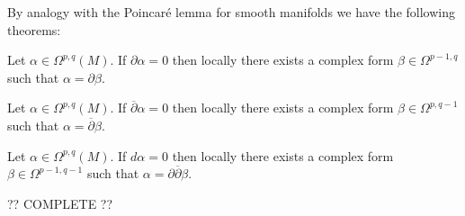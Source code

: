     By analogy with the Poincar\'e lemma for smooth manifolds we have the following theorems:
    \begin{theorem}
        Let $\alpha\in\Omega^{p, q}(M)$. If $\partial\alpha = 0$ then locally there exists a complex form $\beta\in\Omega^{p-1, q}$ such that $\alpha = \partial\beta$.
    \end{theorem}
    \begin{theorem}
        Let $\alpha\in\Omega^{p, q}(M)$. If $\overline{\partial}\alpha = 0$ then locally there exists a complex form $\beta\in\Omega^{p, q-1}$ such that $\alpha = \overline{\partial}\beta$.
    \end{theorem}
    \begin{theorem}\label{complex:del_delbar_lemma}
        Let $\alpha\in\Omega^{p, q}(M)$. If $d\alpha = 0$ then locally there exists a complex form $\beta\in\Omega^{p-1, q-1}$ such that $\alpha = \partial\overline{\partial}\beta$.
    \end{theorem}

    ?? COMPLETE ??